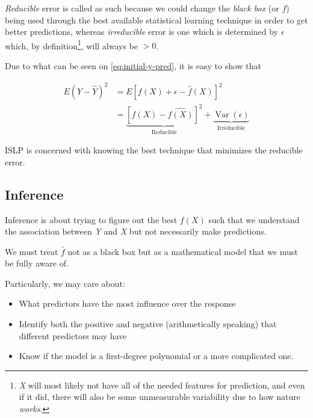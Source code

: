 \documentclass{article}
\theoremstyle{mytheoremstyle}
\theoremstyle{mytheoremstyle}
\theoremstyle{myproblemstyle}
\begin{document}
\textit{Reducible} error is called as such
because we could change the
\textit{black box} (or $ f $)
being used through the best available
statistical learning technique
in order to get better predictions,
whereas \textit{irreducible} error
is one which is determined by $ \epsilon $
which, by definition\footnote{
	\textit{X} will most likely
	not have all of the needed features
	for prediction, and even if
	it did, there will also be some
	unmeasurable variability due to
	how nature \textit{works}.},
will always be $ > 0 $.

Due to what can be seen on \eqref{eq:initial-y-pred},
it is easy to show that


\begin{equation}
	\begin{split}
		E(Y - \hat{Y})^2 & = E[f(X) + \epsilon - \hat{f}(X)]^2                                                                                      \\
		                 & = \underbrace{[f(X) - \hat{f(X)}]^2}_{\text{Reducible}} + \underbrace{\operatorname{Var}(\epsilon)}_{\text{Irreducible}}
	\end{split}
\end{equation}

ISLP is concerned with knowing the best
technique that minimizes the
reducible error.

\subsection{Inference} %

Inference is about trying to figure out
the best $ f(X) $ such that we understand
the association between \textit{Y}
and \textit{X}
but not necessarily make predictions.

We must treat $ \hat{f} $ not as a
black box but as a mathematical
model that we must be fully aware of.

Particularly, we may care about:

\begin{itemize}
	\item What predictors have the most influence over the response
	\item Identify both the positive and negative (arithmetically speaking)
	      that different predictors may have
	\item Know if the model is a first-degree polynomial or a more complicated one.
\end{itemize}
\end{document}
